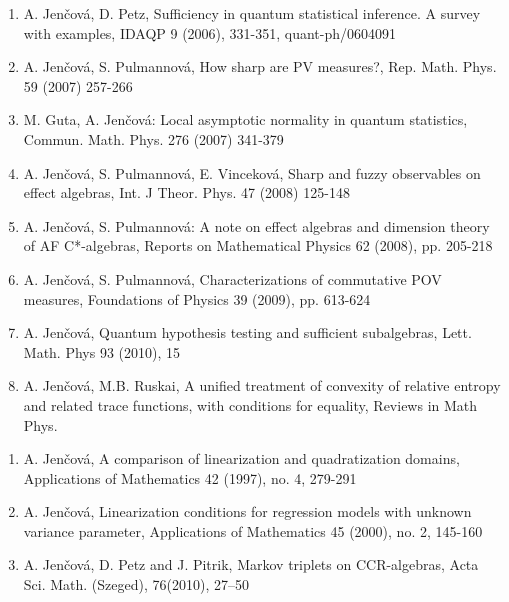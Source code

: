 \documentclass[A4paper]{article}
\begin{document}
\begin{enumerate}
\item \label{survey} A. Jen\v cov\'a, D. Petz, Sufficiency in quantum statistical inference. A survey with examples, IDAQP 9 (2006),  331-351, quant-ph/0604091 	

\item \label{howsharp} A. Jenčová, S. Pulmannová, How sharp are PV measures?, 
Rep. Math. Phys. 59 (2007) 257-266 

\item \label{qlan} M. Guta, A. Jenčová: Local asymptotic normality in quantum statistics,  Commun. Math. Phys. 276 (2007) 341-379 


\item \label{sharpfuzzy} A. Jenčová, S. Pulmannová, E. Vinceková, Sharp and fuzzy observables on effect algebras, Int. J Theor. Phys. 47 (2008) 125-148

\item \label{af} A. Jenčová, S. Pulmannová: A note on  effect algebras and dimension theory of AF C*-algebras, Reports on Mathematical Physics 62 (2008), pp. 205-218

\item\label{characterization}  A. Jenčová, S. Pulmannová, Characterizations of commutative POV 
measures, Foundations of Physics 39 (2009), pp. 613-624 


\item \label{hypo} A. Jenčová, Quantum hypothesis testing and sufficient subalgebras, 
Lett. Math. Phys 93 (2010), 15

\item \label{ruskai} A. Jenčová, M.B. Ruskai, A unified treatment of convexity of relative
entropy and related trace functions, with conditions for equality, Reviews in Math Phys.
\setcounter{foo}{\value{enumi}}

\end{enumerate}



\begin{enumerate}
\setcounter{enumi}{\value{foo}}
\item \label{lin_comparison}A. Jen\v cov\'a, A comparison of linearization and quadratization
 domains, Applications of Mathematics 42 (1997), no. 4, 279-291

\item \label{lin_unknown} A. Jen\v cov\'a, Linearization conditions for regression models
with unknown variance parameter, Applications of Mathematics 45
(2000), no. 2, 145-160

\item \label{weyl} A. Jenčová, D. Petz and J. Pitrik,  Markov triplets on CCR-algebras, Acta Sci. Math. (Szeged),   76(2010),  27--50
\setcounter{foo}{\value{enumi}}

\end{enumerate}
\end{document}
